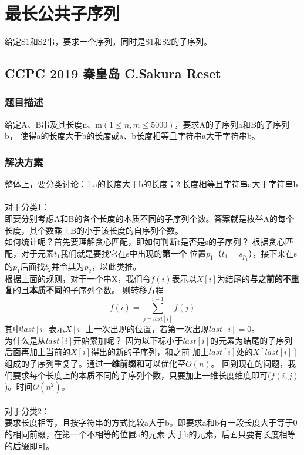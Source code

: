 \section{最长公共子序列}
    给定S1和S2串，要求一个序列，同时是S1和S2的子序列。
\subsection{CCPC 2019 秦皇岛 C.Sakura Reset}
    \subsubsection{题目描述}
        给定A、B串及其长度n、m$(1\le n,m\le 5000)$，要求A的子序列a和B的子序列b，
        使得a的长度大于b的长度或a、b长度相等且字符串a大于字符串b。
    \subsubsection{解决方案}
        整体上，要分类讨论：1.a的长度大于b的长度；2.长度相等且字符串a大于字符串b\\\\
        对于分类1：\\
        即要分别考虑A和B的各个长度的本质不同的子序列个数。答案就是枚举A的每个长度，其个数乘上B的小于该长度的自序列个数。\\
        如何统计呢？首先要理解贪心匹配，即如何判断t是否是s的子序列？
        根据贪心匹配，对于元素$t_1$我们就是要找它在s中出现的\textbf{第一个}
        位置$p_1$（$t_1=s_{p_1}$），接下来在s的$p_1$后面找$t_2$并令其为$p_2$，以此类推。\\
        根据上面的规则，对于一个串X，我们令$f(i)$表示以$X[i]$为结尾的\textbf{与之前的不重复}的且\textbf{本质不同}的子序列个数。
        则转移方程
        $$f(i)=\sum_{j=last[i]}^{i-1}{f(j)}$$
        其中$last[i]$表示$X[i]$上一次出现的位置，若第一次出现$last[i]=0$。\\
        为什么是从$last[i]$开始累加呢？
        因为以下标小于$last[i]$的元素为结尾的子序列后面再加上当前的$X[i]$得出的新的子序列，和之前
        加上$last[i]$处的$X[last[i]]$组成的子序列重复了。通过\textbf{一维前缀和}可以优化至$O(n)$。
        回到现在的问题，我们要求每个长度上的本质不同的子序列个数，只要加上一维长度维度即可($f(i,j)$)。时间$O(n^2)$。\\\\
        对于分类2：\\
        要求长度相等，且按字符串的方式比较a大于b。即要求a和b有一段长度大于等于0的相同前缀，在第一个不相等的位置a的元素
        大于b的元素，后面只要有长度相等的后缀即可。\\
